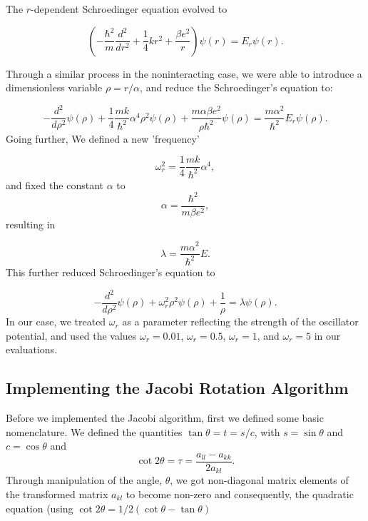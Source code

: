 \documentclass[10pt,showpacs,preprintnumbers,footinbib,amsmath,amssymb,aps,prl,twocolumn,groupedaddress,superscriptaddress,showkeys]{revtex4-1}
\begin{document}
The $r$-dependent Schroedinger equation evolved to

\begin{equation*}
\left(  -\frac{\hbar^2}{m} \frac{d^2}{dr^2}+ \frac{1}{4}k r^2+\frac{\beta e^2}{r}\right)\psi(r)  = E_r \psi(r).
\end{equation*}

Through a similar process in the noninteracting case, we were able to introduce a dimensionless variable $\rho = r/\alpha$, and reduce the Schroedinger's equation to:

\begin{equation*}
-\frac{d^2}{d\rho^2} \psi(\rho) 
+ \frac{1}{4}\frac{mk}{\hbar^2} \alpha^4\rho^2\psi(\rho)+\frac{m\alpha \beta e^2}{\rho\hbar^2}\psi(\rho)  = 
\frac{m\alpha^2}{\hbar^2}E_r \psi(\rho) .
\end{equation*}
Going further, We defined a new 'frequency'

\begin{equation*}
\omega_r^2=\frac{1}{4}\frac{mk}{\hbar^2} \alpha^4,
\end{equation*}
and fixed the constant $\alpha$ to
\begin{equation*}
\alpha = \frac{\hbar^2}{m\beta e^2},
\end{equation*}
resulting in

\begin{equation*}
\lambda = \frac{m\alpha^2}{\hbar^2}E.
\end{equation*}
This further reduced Schroedinger's equation to

\begin{equation*}
-\frac{d^2}{d\rho^2} \psi(\rho) + \omega_r^2\rho^2\psi(\rho) +\frac{1}{\rho} = \lambda \psi(\rho).
\end{equation*}
In our case, we treated $\omega_r$ as a parameter reflecting the strength of the oscillator potential, and used the values
$\omega_r = 0.01$, $\omega_r = 0.5$, $\omega_r =1$, and $\omega_r = 5$ in our evaluations.

        \subsection{Implementing the Jacobi Rotation Algorithm}
Before we implemented the Jacobi algorithm, first we defined some basic nomenclature. We defined the quantities $\tan\theta = t= s/c$, with $s=\sin\theta$ and $c=\cos\theta$ and 
\begin{equation*}\cot 2\theta=\tau = \frac{a_{ll}-a_{kk}}{2a_{kl}}.
\end{equation*}
Through manipulation of the angle, $\theta$, we got non-diagonal matrix elements of the transformed matrix 
$a_{kl}$ to become non-zero and
consequently, the quadratic equation (using $\cot 2\theta=1/2(\cot \theta-\tan\theta)$
\end{document}

